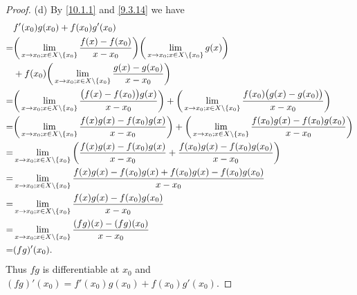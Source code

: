 \begin{proof}{(d)}
  By \cref{10.1.1} and \cref{9.3.14} we have
  \begin{align*}
      & f'(x_0) g(x_0) + f(x_0) g'(x_0)                                                                                                                                                                                       \\
    = & \bigg(\lim_{x \to x_0 ; x \in X \setminus \left\lbrace x_0\right\rbrace} \dfrac{f(x) - f(x_0)}{x - x_0}\bigg) \bigg(\lim_{x \to x_0 ; x \in X \setminus \left\lbrace x_0\right\rbrace} g(x)\bigg)                                                             \\
      & + f(x_0) \bigg(\lim_{x \to x_0 ; x \in X \setminus \left\lbrace x_0\right\rbrace} \dfrac{g(x) - g(x_0)}{x - x_0}\bigg)                                                                                                                    \\
    = & \bigg(\lim_{x \to x_0 ; x \in X \setminus \left\lbrace x_0\right\rbrace} \dfrac{\big(f(x) - f(x_0)\big) g(x)}{x - x_0}\bigg) + \bigg(\lim_{x \to x_0 ; x \in X \setminus \left\lbrace x_0\right\rbrace} \dfrac{f(x_0) \big(g(x) - g(x_0)\big)}{x - x_0}\bigg) \\
    = & \bigg(\lim_{x \to x_0 ; x \in X \setminus \left\lbrace x_0\right\rbrace} \dfrac{f(x) g(x) - f(x_0) g(x)}{x - x_0}\bigg) + \bigg(\lim_{x \to x_0 ; x \in X \setminus \left\lbrace x_0\right\rbrace} \dfrac{f(x_0) g(x) - f(x_0) g(x_0)}{x - x_0}\bigg)         \\
    = & \lim_{x \to x_0 ; x \in X \setminus \left\lbrace x_0\right\rbrace} \bigg(\dfrac{f(x) g(x) - f(x_0) g(x)}{x - x_0} + \dfrac{f(x_0) g(x) - f(x_0) g(x_0)}{x - x_0}\bigg)                                                                    \\
    = & \lim_{x \to x_0 ; x \in X \setminus \left\lbrace x_0\right\rbrace} \dfrac{f(x) g(x) - f(x_0) g(x) + f(x_0) g(x) - f(x_0) g(x_0)}{x - x_0}                                                                                                 \\
    = & \lim_{x \to x_0 ; x \in X \setminus \left\lbrace x_0\right\rbrace} \dfrac{f(x) g(x) - f(x_0) g(x_0)}{x - x_0}                                                                                                                             \\
    = & \lim_{x \to x_0 ; x \in X \setminus \left\lbrace x_0\right\rbrace} \dfrac{(fg)(x) - (fg)(x_0)}{x - x_0}                                                                                                                                   \\
    = & (fg)'(x_0).
  \end{align*}
  Thus \(fg\) is differentiable at \(x_0\) and \((fg)'(x_0) = f'(x_0) g(x_0) + f(x_0) g'(x_0)\).
\end{proof}


